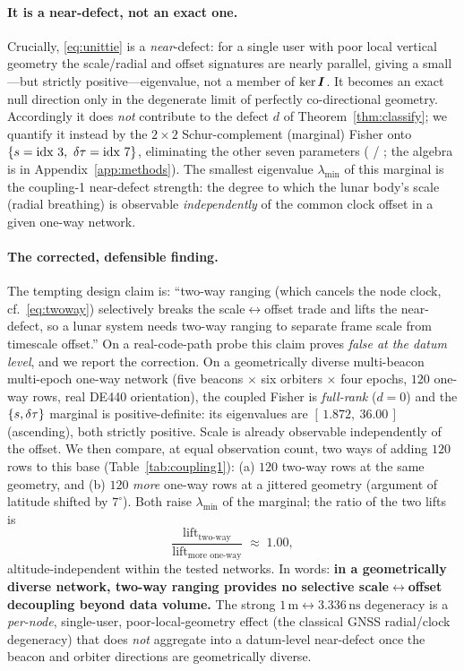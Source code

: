 \paragraph{It is a near-defect, not an exact one.}
Crucially, \eqref{eq:unittie} is a \emph{near}-defect: for a single user with poor local
vertical geometry the scale/radial and offset signatures are nearly parallel, giving a
small---but strictly positive---eigenvalue, not a member of $\ker\bm{I}$. It becomes an
exact null direction only in the degenerate limit of perfectly co-directional geometry.
Accordingly it does \emph{not} contribute to the defect $d$ of Theorem~\ref{thm:classify};
we quantify it instead by the $2\times2$ Schur-complement (marginal) Fisher onto
$\{s=\text{idx }3,\ \delta\tau=\text{idx }7\}$, eliminating the other seven parameters
( / ; the algebra is in
Appendix~\ref{app:methods}). The smallest eigenvalue $\lambda_{\min}$ of this marginal is
the coupling-1 near-defect strength: the degree to which the lunar body's scale
(radial breathing) is observable \emph{independently} of the common clock offset in a given
one-way network.

\paragraph{The corrected, defensible finding.}
The tempting design claim is: ``two-way ranging (which cancels the node clock, cf.\
\eqref{eq:twoway}) selectively breaks the scale$\leftrightarrow$offset trade and lifts the
near-defect, so a lunar system needs two-way ranging to separate frame scale from
timescale offset.'' On a real-code-path probe this claim proves \emph{false at the datum
level}, and we report the correction. On a geometrically diverse multi-beacon
multi-epoch one-way network (five beacons $\times$ six orbiters $\times$ four epochs,
$120$ one-way rows, real DE440 orientation), the coupled Fisher is \emph{full-rank}
($d=0$) and the $\{s,\delta\tau\}$ marginal is positive-definite: its eigenvalues are
$[\,1.872,\ 36.00\,]$ (ascending), both strictly positive. Scale is already observable
independently of the offset. We then compare, at equal observation count, two ways of
adding $120$ rows to this base (Table~\ref{tab:coupling1}): (a) $120$ two-way rows at the
same geometry, and (b) $120$ \emph{more} one-way rows at a jittered geometry (argument of
latitude shifted by $7^\circ$). Both raise $\lambda_{\min}$ of the marginal; the ratio of
the two lifts is
\begin{equation}
  \frac{\text{lift}_{\text{two-way}}}{\text{lift}_{\text{more one-way}}}\;\approx\;1.00,
  \label{eq:liftratio}
\end{equation}
altitude-independent within the tested networks. In words: \textbf{in a geometrically
diverse network, two-way ranging provides no selective scale$\leftrightarrow$offset
decoupling beyond data volume.} The strong $1\,\text{m}\leftrightarrow3.336\,\text{ns}$
degeneracy is a \emph{per-node}, single-user, poor-local-geometry effect (the classical
GNSS radial/clock degeneracy) that does \emph{not} aggregate into a datum-level near-defect
once the beacon and orbiter directions are geometrically diverse.

